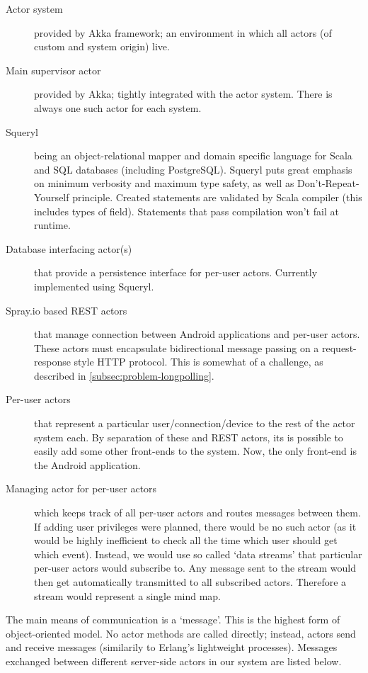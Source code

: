 \begin{description}
	\item[Actor system]{provided by Akka framework; an environment in which all actors (of custom and system origin) live.}
	\item[Main supervisor actor]{provided by Akka; tightly integrated with the actor system. There is always one such actor for each system.}
	\item[Squeryl]{being an object-relational mapper and domain specific language for Scala and SQL databases (including PostgreSQL). Squeryl puts great emphasis on minimum verbosity and maximum type safety, as well as Don't-Repeat-Yourself principle. Created statements are validated by Scala compiler (this includes types of field). Statements that pass compilation won't fail at runtime\cite{Squeryl:Intro}.}
	\item[Database interfacing actor(s)]{that provide a persistence interface for per-user actors. Currently implemented using Squeryl.}
	\item[Spray.io based REST actors]{that manage connection between Android applications and per-user actors. These actors must encapsulate bidirectional message passing on a request-response style HTTP protocol. This is somewhat of a challenge, as described in \cref{subsec:problem-longpolling}.}
	\item[Per-user actors]{that represent a particular user/connection/device to the rest of the actor system each. By separation of these and REST actors, its is possible to easily add some other front-ends to the system. Now, the only front-end is the Android application.}
	\item[Managing actor for per-user actors]{which keeps track of all per-user actors and routes messages between them. If adding user privileges were planned, there would be no such actor (as it would be highly inefficient to check all the time which user should get which event). Instead, we would use so called `data streams' that particular per-user actors would subscribe to. Any message sent to the stream would then get automatically transmitted to all subscribed actors. Therefore a stream would represent a single mind map.}
\end{description}

The main means of communication is a `message'. This is the highest form of object-oriented model. No actor methods are called directly; instead, actors send and receive messages (similarily to Erlang's lightweight processes). Messages exchanged between different server-side actors in our system are listed below.

